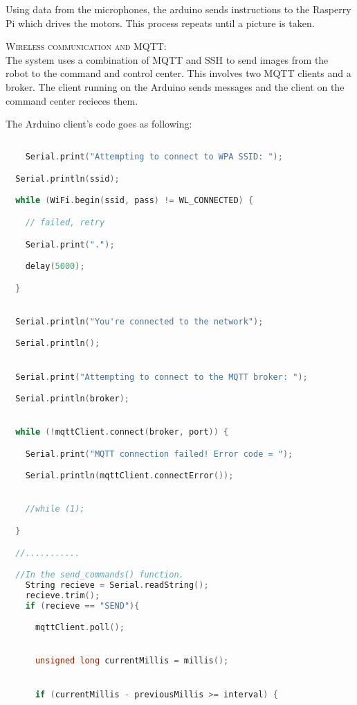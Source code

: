 \documentclass[12pt,a4paper]{article}
\begin{document}
Using data from the microphones, the arduino sends instructions to the Rasperry Pi which drives the motors.
This process repeats until a picture is taken.

\clearpage

\newpage

\textsc{\LARGE  Wireless communication and MQTT: }\\[1.5cm]

The system uses a combination of MQTT and SSH to send images from the robot to the command and control center.
This involves two MQTT clients and a broker. The client running on the Arduino sends messages and the client on the command center recieces them.

The Arduino client's code goes as following:

\begin{lstlisting}[language=C, caption=Arduino Client]

    Serial.print("Attempting to connect to WPA SSID: ");

  Serial.println(ssid);

  while (WiFi.begin(ssid, pass) != WL_CONNECTED) {

    // failed, retry

    Serial.print(".");

    delay(5000);

  }


  Serial.println("You're connected to the network");

  Serial.println();


  Serial.print("Attempting to connect to the MQTT broker: ");

  Serial.println(broker);


  while (!mqttClient.connect(broker, port)) {

    Serial.print("MQTT connection failed! Error code = ");

    Serial.println(mqttClient.connectError());


    //while (1);

  }

  //...........

  //In the send_commands() function.
    String recieve = Serial.readString();
    recieve.trim();
    if (recieve == "SEND"){

      mqttClient.poll();


      unsigned long currentMillis = millis();


      if (currentMillis - previousMillis >= interval) {


\end{lstlisting}
\end{document}
